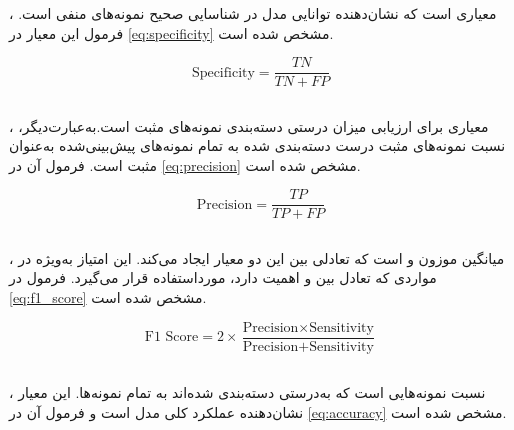 ، معیاری است که نشان‌دهنده توانایی مدل در شناسایی صحیح نمونه‌های منفی است. فرمول این معیار در \autoref{eq:specificity} مشخص شده است.

\begin{latin}
\begin{equation}
\label{eq:specificity}
\text{Specificity} = \frac{TN}{TN + FP}
\end{equation}
\end{latin}

\subsection{}

،
 معیاری برای ارزیابی میزان درستی دسته‌بندی نمونه‌های مثبت است.به‌عبارت‌دیگر،
   نسبت نمونه‌های مثبت درست دسته‌بندی شده به تمام نمونه‌های پیش‌بینی‌شده به‌عنوان مثبت است. فرمول آن در
    \autoref{eq:precision}
     مشخص شده است.

\begin{latin}
\begin{equation}
\label{eq:precision}
\text{Precision} = \frac{TP}{TP + FP}
\end{equation}
\end{latin}

\subsection{}

، میانگین موزون  و  است که تعادلی بین این دو معیار ایجاد می‌کند. این امتیاز به‌ویژه در مواردی که تعادل بین  و  اهمیت دارد، مورداستفاده قرار می‌گیرد. فرمول  در \autoref{eq:f1_score} مشخص شده است.

\begin{latin}
\begin{equation}
\label{eq:f1_score}
\text{F1 Score} = 2 \times \frac{\text{Precision} \times \text{Sensitivity}}{\text{Precision} + \text{Sensitivity}}
\end{equation}
\end{latin}

\subsection{}

، نسبت نمونه‌هایی است که به‌درستی دسته‌بندی شده‌اند به تمام نمونه‌ها. این معیار نشان‌دهنده عملکرد کلی مدل است و فرمول آن در \autoref{eq:accuracy} مشخص شده است.

